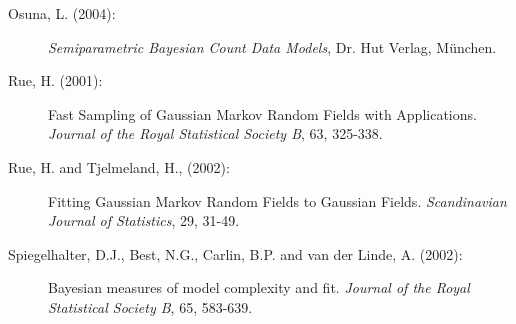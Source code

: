 \documentclass[11pt,a4paper,twoside]{bayesxarticle}
\begin{document}
\begin{description}
\item[Osuna, L. (2004):] {\it Semiparametric Bayesian Count Data
Models}, Dr. Hut Verlag, M\"{u}nchen.

\item[Rue, H. (2001):] Fast Sampling of Gaussian Markov Random Fields with Applications.
{\em Journal of the Royal Statistical Society B}, 63, 325-338.

\item[Rue, H. and Tjelmeland, H., (2002):]
Fitting Gaussian Markov Random Fields to Gaussian Fields. {\it
Scandinavian Journal of Statistics}, 29, 31-49.

\item[Spiegelhalter, D.J., Best, N.G., Carlin, B.P. and van der Linde, A. (2002):]
Bayesian measures of model complexity and fit. {\em Journal of the
Royal Statistical Society B}, 65, 583-639.

\end{description}


\hypertarget{index}{}
\end{document}
